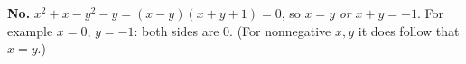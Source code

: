 \textbf{No.} $x^2+x-y^2-y=(x-y)(x+y+1)=0$, so $x=y$ \emph{or} $x+y=-1$. For example $x=0$, $y=-1$: both sides are $0$. (For nonnegative $x,y$ it does follow that $x=y$.)
